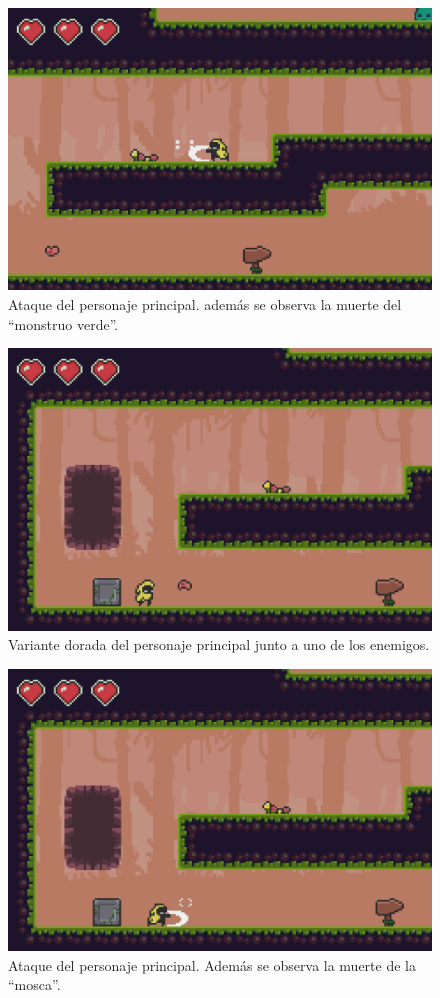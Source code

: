 \begin{figure}[h]
	\centering
	\includegraphics[width=.6\textwidth]{capitulos/apendice/sprites_5.png}
	\caption{Ataque del personaje principal. además se observa la muerte del ``monstruo verde''.}\label{fig:ap_sprites_5}
\end{figure}

\begin{figure}[h]
	\centering
	\includegraphics[width=.6\textwidth]{capitulos/apendice/sprites_7.png}
	\caption{Variante dorada del personaje principal junto a uno de los enemigos.}\label{fig:ap_sprites_7}
\end{figure}

\begin{figure}[h]
	\centering
	\includegraphics[width=.6\textwidth]{capitulos/apendice/sprites_6.png}
	\caption{Ataque del personaje principal. Además se observa la muerte de la ``mosca''.}\label{fig:ap_sprites_6}
\end{figure}


